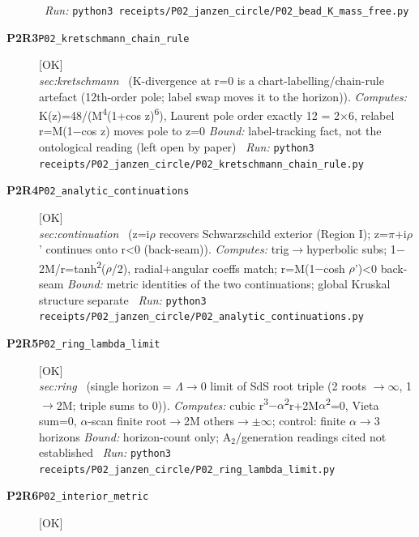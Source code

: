 \begin{description}
\ \emph{Run:} \texttt{python3 receipts/P02\_janzen\_circle/P02\_bead\_K\_mass\_free.py}
\item[\rcptlabel{P02_kretschmann_chain_rule}{P2R3}\textbf{P2R3}\quad\texttt{P02\_kretschmann\_chain\_rule}]\hfill\textsf{[OK]}\\
\textit{sec:kretschmann} \ (K-divergence at r=0 is a chart-labelling/chain-rule artefact (12th-order pole; label swap moves it to the horizon)). 
\emph{Computes:} K(z)=48/(M\textsuperscript{4}(1+cos z)\textsuperscript{6}), Laurent pole order exactly 12 = 2\ensuremath{\times}6, relabel r=M(1\ensuremath{-}cos z) moves pole to z=0
 \emph{Bound:} label-tracking fact, not the ontological reading (left open by paper)
\ \emph{Run:} \texttt{python3 receipts/P02\_janzen\_circle/P02\_kretschmann\_chain\_rule.py}
\item[\rcptlabel{P02_analytic_continuations}{P2R4}\textbf{P2R4}\quad\texttt{P02\_analytic\_continuations}]\hfill\textsf{[OK]}\\
\textit{sec:continuation} \ (z=i\ensuremath{\rho} recovers Schwarzschild exterior (Region I); z=\ensuremath{\pi}+i\ensuremath{\rho}' continues onto r<0 (back-seam)). 
\emph{Computes:} trig\ensuremath{\to}hyperbolic subs; 1\ensuremath{-}2M/r=tanh\textsuperscript{2}(\ensuremath{\rho}/2), radial+angular coeffs match; r=M(1\ensuremath{-}cosh \ensuremath{\rho}')<0 back-seam
 \emph{Bound:} metric identities of the two continuations; global Kruskal structure separate
\ \emph{Run:} \texttt{python3 receipts/P02\_janzen\_circle/P02\_analytic\_continuations.py}
\item[\rcptlabel{P02_ring_lambda_limit}{P2R5}\textbf{P2R5}\quad\texttt{P02\_ring\_lambda\_limit}]\hfill\textsf{[OK]}\\
\textit{sec:ring} \ (single horizon = \ensuremath{\Lambda}\ensuremath{\to}0 limit of SdS root triple (2 roots \ensuremath{\to}\ensuremath{\infty}, 1 \ensuremath{\to}2M; triple sums to 0)). 
\emph{Computes:} cubic r\textsuperscript{3}\ensuremath{-}\ensuremath{\alpha}\textsuperscript{2}r+2M\ensuremath{\alpha}\textsuperscript{2}=0, Vieta sum=0, \ensuremath{\alpha}-scan finite root\ensuremath{\to}2M others\ensuremath{\to}\ensuremath{\pm}\ensuremath{\infty}; control: finite \ensuremath{\alpha}\ensuremath{\to}3 horizons
 \emph{Bound:} horizon-count only; A\ensuremath{_2}/generation readings cited not established
\ \emph{Run:} \texttt{python3 receipts/P02\_janzen\_circle/P02\_ring\_lambda\_limit.py}
\item[\rcptlabel{P02_interior_metric}{P2R6}\textbf{P2R6}\quad\texttt{P02\_interior\_metric}]\hfill\textsf{[OK]}\\

\end{description}

